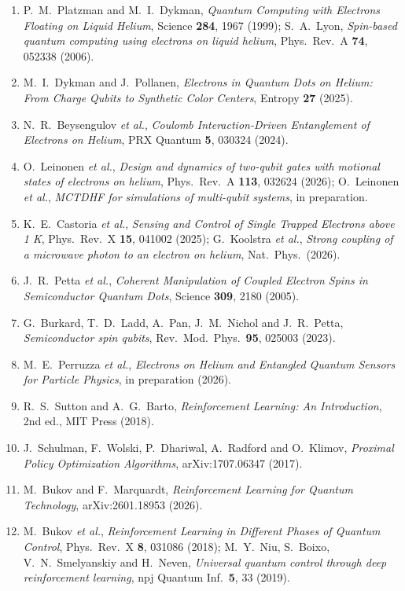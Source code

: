 \documentclass[12pt,a4paper]{article}
\begin{document}
\begin{enumerate}
    \item P.~M.~Platzman and M.~I.~Dykman, \textit{Quantum Computing with Electrons Floating on Liquid Helium}, Science \textbf{284}, 1967 (1999); S.~A.~Lyon, \textit{Spin-based quantum computing using electrons on liquid helium}, Phys.\ Rev.\ A \textbf{74}, 052338 (2006).
    \item M.~I.~Dykman and J.~Pollanen, \textit{Electrons in Quantum Dots on Helium: From Charge Qubits to Synthetic Color Centers}, Entropy \textbf{27} (2025).
    \item N.~R.~Beysengulov \textit{et al.}, \textit{Coulomb Interaction-Driven Entanglement of Electrons on Helium}, PRX Quantum \textbf{5}, 030324 (2024).
    \item O.~Leinonen \textit{et al.}, \textit{Design and dynamics of two-qubit gates with motional states of electrons on helium}, Phys.\ Rev.\ A \textbf{113}, 032624 (2026); O.~Leinonen \textit{et al.}, \textit{MCTDHF for simulations of multi-qubit systems}, in preparation.
    \item K.~E.~Castoria \textit{et al.}, \textit{Sensing and Control of Single Trapped Electrons above 1 K}, Phys.\ Rev.\ X \textbf{15}, 041002 (2025); G.~Koolstra \textit{et al.}, \textit{Strong coupling of a microwave photon to an electron on helium}, Nat.\ Phys.\ (2026).
    \item J.~R.~Petta \textit{et al.}, \textit{Coherent Manipulation of Coupled Electron Spins in Semiconductor Quantum Dots}, Science \textbf{309}, 2180 (2005).
    \item G.~Burkard, T.~D.~Ladd, A.~Pan, J.~M.~Nichol and J.~R.~Petta, \textit{Semiconductor spin qubits}, Rev.\ Mod.\ Phys.\ \textbf{95}, 025003 (2023).
    \item M.~E.~Perruzza \textit{et al.}, \textit{Electrons on Helium and Entangled Quantum Sensors for Particle Physics}, in preparation (2026).
    \item R.~S.~Sutton and A.~G.~Barto, \textit{Reinforcement Learning: An Introduction}, 2nd ed., MIT Press (2018).
    \item J.~Schulman, F.~Wolski, P.~Dhariwal, A.~Radford and O.~Klimov, \textit{Proximal Policy Optimization Algorithms}, arXiv:1707.06347 (2017).
    \item M.~Bukov and F.~Marquardt, \textit{Reinforcement Learning for Quantum Technology}, arXiv:2601.18953 (2026).
    \item M.~Bukov \textit{et al.}, \textit{Reinforcement Learning in Different Phases of Quantum Control}, Phys.\ Rev.\ X \textbf{8}, 031086 (2018); M.~Y.~Niu, S.~Boixo, V.~N.~Smelyanskiy and H.~Neven, \textit{Universal quantum control through deep reinforcement learning}, npj Quantum Inf.\ \textbf{5}, 33 (2019).

\end{enumerate}
\end{document}
